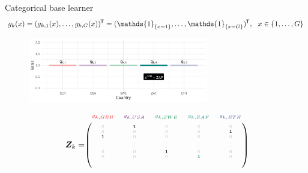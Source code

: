 \documentclass[t,10pt]{beamer}
\begin{document}
\begin{frame}{Categorical base learner}
  \vspace{-0.3cm}\[g_k(x) = (g_{k,1}(x), \dots, g_{k,G}(x))^\tran = (\mathds{1}_{\{x = 1\}}, \dots, \mathds{1}_{\{x = G\}})^\tran, \ \ x\in\{1, \dots, G\}\]
  \begin{center}
    \begin{figure}
      \includegraphics[width=0.7\textwidth]{figures/bs-cat/fig-cat5.png}
    \end{figure}
    \vspace{-0.5cm}
    \[
      \design_k = \tiny\begin{blockarray}{ccccc}
        \color[HTML]{EE0000}g_{k,GER} & \color[HTML]{631879}g_{k,USA} & \color[HTML]{008B45}g_{k,SWE} & \color[HTML]{008280}g_{k,ZAF} & \color[HTML]{3B4992}g_{k,ETH}\\
      \begin{block}{(ccccc)}
        \phantom{x}\\
        \color{lightgray}0 & \color{black}\bm{1} & \color{lightgray}0 & \color{lightgray}0 & \color{lightgray}0 \\
        \color{lightgray}0 & \color{lightgray}0 & \color{lightgray}0 & \color{lightgray}0 & \color{black}\bm{1} \\
        \color{black}\bm{1} & \color{lightgray}0 & \color{lightgray}0 & \color{lightgray}0 & \color{lightgray}0 \\
        \color{lightgray}\vdots & \color{lightgray}\vdots & \color{lightgray}\vdots & \color{lightgray}\vdots & \color{lightgray}\vdots \\
        \color{lightgray}0 & \color{lightgray}0 & \color{black}\bm{1} & \color{lightgray}0 & \color{lightgray}0 \\
        \color{lightgray}0 & \color{lightgray}0 & \color{lightgray}0 & \color[HTML]{008280}\bm{1} & \color{lightgray}0 \\
        \color{white}0 & \color{white}0 & \color{white}0 & \color{white}0 & \color{white}0 \color{black}\\
        \phantom{x}\\
      \end{block}
    \end{blockarray}
    \]
    \normalsize
  \end{center}
  \addtocounter{framenumber}{-1}
\end{frame}
\end{document}
